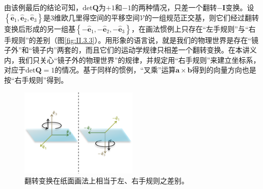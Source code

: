 \documentclass[../main.tex]{subfiles}
\begin{document}
由该例最后的结论可知，$\mathrm{det}\mathbf{Q}$为$+1$和$-1$的两种情况，只差一个翻转$-\mathbf{I}$变换。设$\left\{\mathbf{\hat{e}}_1,\mathbf{\hat{e}}_2,\mathbf{\hat{e}}_3\right\}$是3维欧几里得空间的平移空间$\mathcal{V}$的一组规范正交基，则它们经过翻转变换后形成的另一组基$\left\{-\mathbf{\hat{e}}_1,-\mathbf{\hat{e}}_2,-\mathbf{\hat{e}}_3\right\}$，在画法惯例上只存在“左手规则”与“右手规则”的差别（图\ref{fig:II.3.3}）。用形象的语言说，就是我们的物理世界是存在“镜子外”和“镜子内”两套的，而且它们的运动学规律只相差一个翻转变换。在本讲义内，我们只关心“镜子外的物理世界”的规律，并规定用“右手规则”来建立坐标系，对应于$\mathrm{det}\mathbf{Q}=1$的情况。基于同样的惯例，“叉乘”运算$\mathbf{a}\times\mathbf{b}$得到的向量方向也是按“右手规则”得到。

\begin{figure}[ht]
    \centering
    \includegraphics[width=0.5\textwidth]{images/II.3.3.pdf}
    \caption{翻转变换在纸面画法上相当于左、右手规则之差别。}
    \label{fig:II.3.4}
\end{figure}
\end{document}
